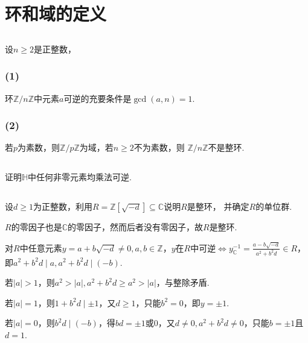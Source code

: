 \section{环和域的定义}
\subsection{}
设$n\geq 2$是正整数，
\subsubsection{(1)}
环$\mathbb{Z}/n\mathbb{Z}$中元素$a$可逆的充要条件是$\gcd(a,n)=1$.
\subsubsection{(2)}
若$p$为素数，则$\mathbb{Z}/p\mathbb{Z}$为域，若$n\geq 2$不为素数，则
$\mathbb{Z}/n\mathbb{Z}$不是整环.

\Proofbyintimidation

\subsection{}
证明$\mathbb{H}$中任何非零元素均乘法可逆.


\subsection{}
设$d\geq 1$为正整数，利用$R=\mathbb{Z}[\sqrt{-d}]\subseteq \mathbb{C}$说明$R$是整环，
并确定$R$的单位群.

\jie $R$的零因子也是$\mathbb{C}$的零因子，然而后者没有零因子，故$R$是整环.

对$R$中任意元素$y=a+b\sqrt{-d}\neq 0, a,b\in\mathbb{Z}$，$y$在$R$中可逆$\Leftrightarrow
y^{-1}_{\mathbb{C}}=\frac{a-b\sqrt{-d}}{a^2+b^2d}\in R$，即$a^2+b^2d\mid a, a^2+b^2d\mid (-b)$.

若$|a|>1$，则$a^2>|a|,a^2+b^2d\geq a^2>|a|$，与整除矛盾.

若$|a|=1$，则$1+b^2d\mid \pm1$，又$d\geq 1$，只能$b^2=0$，即$y=\pm 1$.

若$|a|=0$，则$b^2d\mid (-b)$，得$bd=\pm 1$或$0$，又$d\neq 0, a^2+b^2d\neq 0$，只能$b=\pm 1$且$d=1$.

